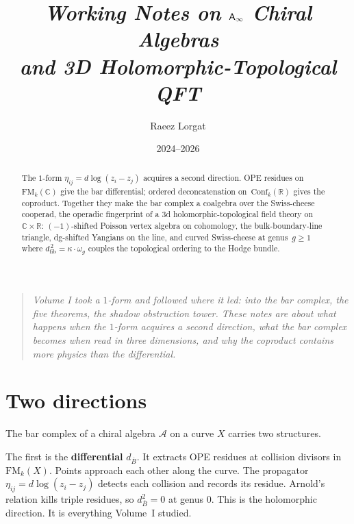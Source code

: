 \documentclass[11pt]{article}
\title{\textit{Working Notes on $\mathsf{A}_{\infty}$ Chiral Algebras\\
and 3D Holomorphic-Topological QFT}}
\author{Raeez Lorgat}
\date{2024--2026}
\newcommand{\cA}{\mathcal{A}}
\newcommand{\barB}{\overline{B}}
\newcommand{\FM}{\mathrm{FM}}
\begin{document}
\maketitle

\begin{abstract}
The $1$-form $\eta_{ij} = d\log(z_i - z_j)$ acquires a second
direction.  OPE residues on~$\mathrm{FM}_k(\mathbb{C})$ give the
bar differential; ordered deconcatenation
on~$\mathrm{Conf}_k(\mathbb{R})$ gives the coproduct.  Together
they make the bar complex a coalgebra over the Swiss-cheese
cooperad, the operadic fingerprint
of a $3$d holomorphic-topological field theory
on~$\mathbb{C} \times \mathbb{R}$:
$(-1)$-shifted Poisson vertex algebra on cohomology,
the bulk-boundary-line triangle, dg-shifted Yangians on the line,
and curved Swiss-cheese at genus~$g \ge 1$ where
$d_{\mathrm{fib}}^{\,2} = \kappa \cdot \omega_g$ couples the
topological ordering to the Hodge bundle.
\end{abstract}

\begin{quote}
\itshape
Volume I took a $1$-form and followed where it led: into the
bar complex, the five theorems, the shadow obstruction tower.
These notes are about what happens when the $1$-form acquires
a second direction, what the bar complex becomes when read in
three dimensions, and why the coproduct contains more physics
than the differential.
\end{quote}

\tableofcontents


\section{Two directions}
\label{sec:two-directions}

The bar complex of a chiral algebra $\cA$ on a curve $X$ carries
two structures.

\medskip

The first is the \textbf{differential} $d_{\barB}$.  It extracts
OPE residues at collision divisors in $\FM_k(X)$.  Points
approach each other along the curve.  The propagator
$\eta_{ij} = d\log(z_i - z_j)$ detects each collision and records
its residue.  Arnold's relation kills triple residues, so
$d_{\barB}^2 = 0$ at genus $0$.  This is the holomorphic
direction.  It is everything Volume~I studied.

\medskip
\end{document}
